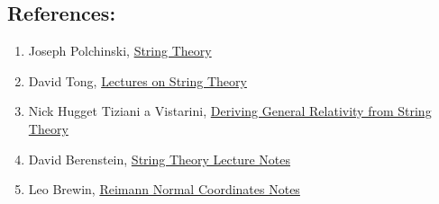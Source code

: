\documentclass{article}
\begin{document}
\subsection*{References:}
\begin{enumerate}
		\item Joseph Polchinski, \href{https://doi.org/10.1017/CBO9780511816079}{String Theory}
\item David Tong, \href{https://www.damtp.cam.ac.uk/user/tong/string.html}{Lectures on String Theory}
	\item  Nick Hugget  Tiziani   a Vistarini, \href{http://philsci-archive.pitt.edu/11116/1/Huggett-Vistarini.pdf}{Deriving General Relativity from String Theory}
	\item David Berenstein, \href{https://web.physics.ucsb.edu/~phys230A/w2016/Lecture_notes.html}{String Theory Lecture Notes}
    \item Leo Brewin, \href{https://users.monash.edu.au/~leo/research/papers/files/lcb96-01.pdf}{Reimann Normal Coordinates Notes} 
\end{enumerate}
\end{document}
